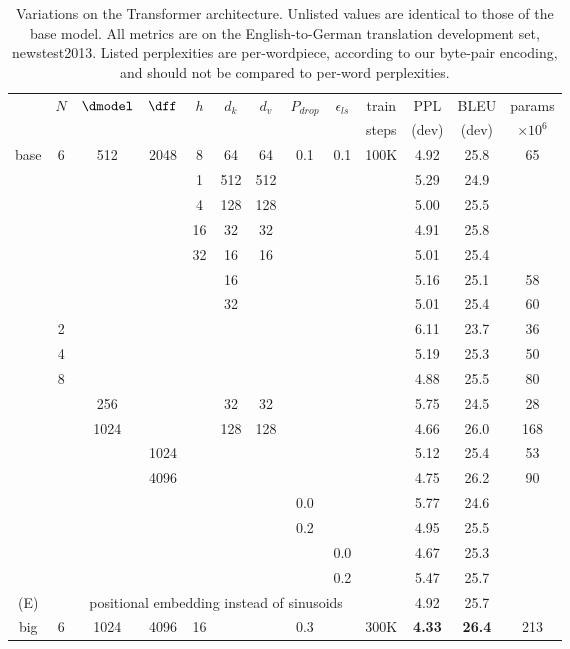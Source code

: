 \begin{table}[t]
\caption{Variations on the Transformer architecture. Unlisted values are identical to those of the base model.  All metrics are on the English-to-German translation development set, newstest2013.  Listed perplexities are per-wordpiece, according to our byte-pair encoding, and should not be compared to per-word perplexities.}
\label{tab:variations}
\begin{center}
\vspace{-2mm}
\begin{tabular}{c|ccccccccc|ccc}
\hline\rule{0pt}{2.0ex}
 & \multirow{2}{*}{$N$} & \multirow{2}{*}{$\dmodel$} &
\multirow{2}{*}{$\dff$} & \multirow{2}{*}{$h$} & 
\multirow{2}{*}{$d_k$} & \multirow{2}{*}{$d_v$} & 
\multirow{2}{*}{$P_{drop}$} & \multirow{2}{*}{$\epsilon_{ls}$} &
train & PPL & BLEU & params \\
 & & & & & & & & & steps & (dev) & (dev) & $\times10^6$ \\
\hline\rule{0pt}{2.0ex}
base & 6 & 512 & 2048 & 8 & 64 & 64 & 0.1 & 0.1 & 100K & 4.92 & 25.8 & 65 \\
\hline\rule{0pt}{2.0ex}
\multirow{4}{*}{(A)}
& & & & 1 & 512 & 512 & & & & 5.29 & 24.9 &  \\
& & & & 4 & 128 & 128 & & & & 5.00 & 25.5 &  \\
& & & & 16 & 32 & 32 & & & & 4.91 & 25.8 &  \\
& & & & 32 & 16 & 16 & & & & 5.01 & 25.4 &  \\
\hline\rule{0pt}{2.0ex}
\multirow{2}{*}{(B)}
& & & & & 16 & & & & & 5.16 & 25.1 & 58 \\
& & & & & 32 & & & & & 5.01 & 25.4 & 60 \\
\hline\rule{0pt}{2.0ex}
\multirow{7}{*}{(C)}
& 2 & & & & & & & &            & 6.11 & 23.7 & 36 \\
& 4 & & & & & & & &            & 5.19 & 25.3 & 50 \\
& 8 & & & & & & & &            & 4.88 & 25.5 & 80 \\
& & 256 & & & 32 & 32 & & &    & 5.75 & 24.5 & 28 \\
& & 1024 & & & 128 & 128 & & & & 4.66 & 26.0 & 168 \\
& & & 1024 & & & & & &         & 5.12 & 25.4 & 53 \\
& & & 4096 & & & & & &         & 4.75 & 26.2 & 90 \\
\hline\rule{0pt}{2.0ex}
\multirow{4}{*}{(D)}
& & & & & & & 0.0 & & & 5.77 & 24.6 &  \\
& & & & & & & 0.2 & & & 4.95 & 25.5 &  \\
& & & & & & & & 0.0 & & 4.67 & 25.3 &  \\
& & & & & & & & 0.2 & & 5.47 & 25.7 &  \\
\hline\rule{0pt}{2.0ex}
(E) & & \multicolumn{7}{c}{positional embedding instead of sinusoids} & & 4.92 & 25.7 & \\
\hline\rule{0pt}{2.0ex}
big & 6 & 1024 & 4096 & 16 & & & 0.3 & & 300K & \textbf{4.33} & \textbf{26.4} & 213 \\
\hline
\end{tabular}
\end{center}
\end{table}

